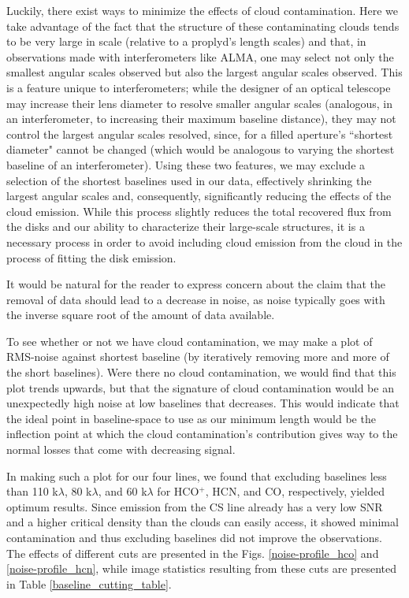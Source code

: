Luckily, there exist ways to minimize the effects of cloud contamination. Here we take advantage of the fact that the structure of these contaminating clouds tends to be very large in scale (relative to a proplyd's length scales) and that, in observations made with interferometers like ALMA, one may select not only the smallest angular scales observed but also the largest angular scales observed. This is a feature unique to interferometers; while the designer of an optical telescope may increase their lens diameter to resolve smaller angular scales (analogous, in an interferometer, to increasing their maximum baseline distance), they may not control the largest angular scales resolved, since, for a filled aperture's ``shortest diameter" cannot be changed (which would be analogous to varying the shortest baseline of an interferometer). Using these two features, we may exclude a selection of the shortest baselines used in our data, effectively shrinking the largest angular scales and, consequently, significantly reducing the effects of the cloud emission. While this process slightly reduces the total recovered flux from the disks and our ability to characterize their large-scale structures, it is a necessary process in order to avoid including cloud emission from the cloud in the process of fitting the disk emission.

It would be natural for the reader to express concern about the claim that the removal of data should lead to a decrease in noise, as noise typically goes with the inverse square root of the amount of data available.

To see whether or not we have cloud contamination, we may make a plot of RMS-noise against shortest baseline (by iteratively removing more and more of the short baselines). Were there no cloud contamination, we would find that this plot trends upwards, but that the signature of cloud contamination would be an unexpectedly high noise at low baselines that decreases. This would indicate that the ideal point in baseline-space to use as our minimum length would be the inflection point at which the cloud contamination's contribution gives way to the normal losses that come with decreasing signal.

In making such a plot for our four lines, we found that excluding baselines less than 110 k$\lambda$, 80 k$\lambda$, and 60  k$\lambda$ for HCO$^{+}$, HCN, and CO, respectively, yielded optimum results. Since emission from the CS line already has a very low SNR and a higher critical density than the clouds can easily access, it showed minimal contamination and thus excluding baselines did not improve the observations. The effects of different cuts are presented in the Figs. \ref{noise-profile_hco} and \ref{noise-profile_hcn}, while image statistics resulting from these cuts are presented in Table \ref{baseline_cutting_table}.

